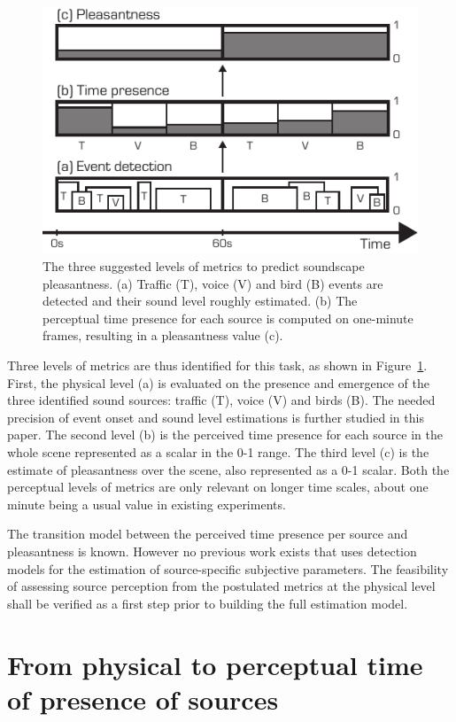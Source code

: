 \documentclass{article}
\begin{document}
\begin{sloppy}
\begin{figure}[t]
  \centering
  \centerline{\includegraphics[width=\columnwidth]{block.pdf}}
  \caption{The three suggested levels of metrics to predict soundscape pleasantness. (a) Traffic (T), voice (V) and bird (B) events are detected and their sound level roughly estimated. (b) The perceptual time presence for each source is computed on one-minute frames, resulting in a pleasantness value (c).}
  \label{fig:block}
\end{figure}

Three levels of metrics are thus identified for this task, as shown in Figure~\ref{fig:block}. First, the physical level (a) is evaluated on the presence and emergence of the three identified sound sources: traffic (T), voice (V) and birds (B). The needed precision of event onset and sound level estimations is further studied in this paper. The second level (b) is the perceived time presence for each source in the whole scene represented as a scalar in the 0-1 range. The third level (c) is the estimate of pleasantness over the scene, also represented as a 0-1 scalar. Both the perceptual levels of metrics are only relevant on longer time scales, about one minute being a usual value in existing experiments.

The transition model between the perceived time presence per source and pleasantness is known. However no previous work exists that uses detection models for the estimation of source-specific subjective parameters. The feasibility of assessing source perception from the postulated metrics at the physical level shall be verified as a first step prior to building the full estimation model.

\section{From physical to perceptual time of presence of sources}
\label{sec:val}


\end{sloppy}
\end{document}
